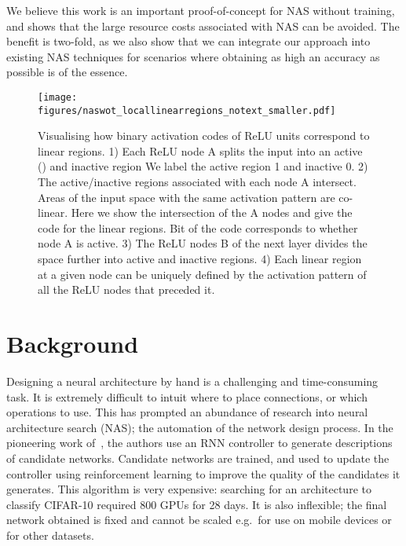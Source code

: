 \documentclass{article}
\begin{document}
We believe this work is an important proof-of-concept for NAS without training, and shows that the large resource costs associated with NAS can be avoided. The benefit is two-fold, as we also show that we can integrate our approach into existing NAS techniques for scenarios where obtaining as high an accuracy as possible is of the essence. 



\begin{figure*}[!h]
\centering

    \texttt{[image: figures/naswot\_locallinearregions\_notext\_smaller.pdf]}
\caption{Visualising how binary activation codes of ReLU units correspond to linear regions. 1) Each ReLU node A splits the input into an active () and inactive region We label the active region 1 and inactive 0. 2) The active/inactive regions associated with each node A intersect. Areas of the input space with the same activation pattern are co-linear. Here we show the intersection of the A nodes and give the code for the linear regions. Bit  of the code corresponds to whether node A is active. 3) The ReLU nodes B of the next layer divides the space further into active and inactive regions. 4) Each linear region at a given node can be uniquely defined by the activation pattern of all the ReLU nodes that preceded it.}
    \label{fig:locallinearcodes} 
\end{figure*}


\section{Background}
\label{sec:lit}

Designing a neural architecture by hand is a challenging and time-consuming task. It is extremely difficult to intuit where to place connections, or which operations to use. This has prompted an abundance of research into neural architecture search (NAS); the automation of the network design process. In the pioneering work of~\cite{zoph2017neural}, the authors use an RNN controller to generate descriptions of candidate networks. Candidate networks are trained, and used to update the controller using reinforcement learning to improve the quality of the candidates it generates. This algorithm is very expensive: searching for an architecture to classify CIFAR-10 required 800 GPUs for 28 days. It is also inflexible; the final network obtained is fixed and cannot be scaled e.g.\ for use on mobile devices or for other datasets.
\end{document}
